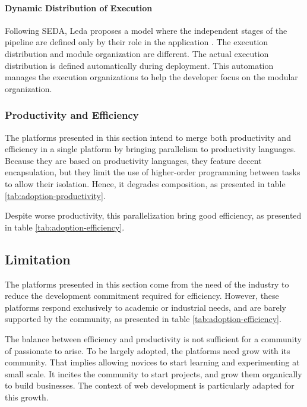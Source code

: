 \paragraph{Dynamic Distribution of Execution}

Following SEDA, Leda proposes a model where the independent stages of the pipeline are defined only by their role in the application \cite{Salmito2013,Salmito2014}.
The execution distribution and module organization are different.
The actual execution distribution is defined automatically during deployment.
This automation manages the execution organizations to help the developer focus on the modular organization.

\subsubsection{Productivity and Efficiency}

The platforms presented in this section intend to merge both productivity and efficiency in a single platform by bringing parallelism to productivity languages.
Because they are based on productivity languages, they feature decent encapsulation, but they limit the use of higher-order programming between tasks to allow their isolation.
Hence, it degrades composition, as presented in table \ref{tab:adoption-productivity}.

Despite worse productivity, this parallelization bring good efficiency, as presented in table \ref{tab:adoption-efficiency}.


\subsection{Limitation}

The platforms presented in this section come from the need of the industry to reduce the development commitment required for efficiency.
However, these platforms respond exclusively to academic or industrial needs, and are barely supported by the community, as presented in table \ref{tab:adoption-efficiency}.

The balance between efficiency and productivity is not sufficient for a community of passionate to arise.
To be largely adopted, the platforms need grow with its community.
That implies allowing novices to start learning and experimenting at small scale.
It incites the community to start projects, and grow them organically to build businesses.
The context of web development is particularly adapted for this growth.

